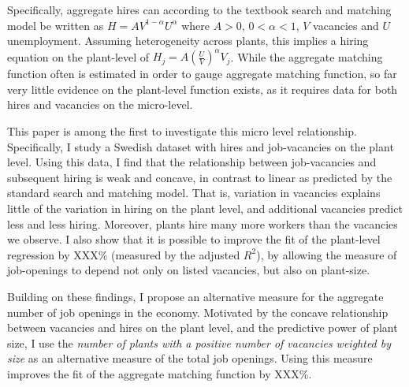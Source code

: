 Specifically, aggregate hires can according to the textbook search and matching model be written as $H=AV^{1-\alpha}U^{\alpha}$
where $A>0$, $0<\alpha<1$, $V$ vacancies and $U$ unemployment. Assuming heterogeneity across plants, this implies a hiring equation on the plant-level of $H_j=A\left(\frac{U}{V}\right)^{\alpha} V_j$. While the aggregate matching function often is estimated in order to gauge aggregate matching function, so far very little evidence on the plant-level function exists, as it requires data for both hires and vacancies on the micro-level.  

This paper is among the first to investigate this micro level relationship. Specifically, I study a Swedish dataset with hires and job-vacancies on the plant level. Using this data, I find that the relationship between job-vacancies and subsequent hiring is weak and concave, in contrast to linear as predicted by the standard search and matching model. That is, variation in vacancies explains little of the variation in hiring on the plant level, and additional vacancies predict less and less hiring. Moreover, plants hire many more workers than the vacancies we observe. I also show that it is possible to improve the fit of the plant-level regression by XXX\% (measured by the adjusted $R^2$), by allowing the measure of job-openings to depend not only on listed vacancies, but also on plant-size. 

Building on these findings, I propose an alternative measure for the aggregate number of job openings in the economy. Motivated by the concave relationship between vacancies and hires on the plant level, and the predictive power of plant size, I use the \emph{number of plants with a positive number of vacancies weighted by size} as an alternative measure of the total job openings. Using this measure improves the fit of the aggregate matching function by XXX\%.

